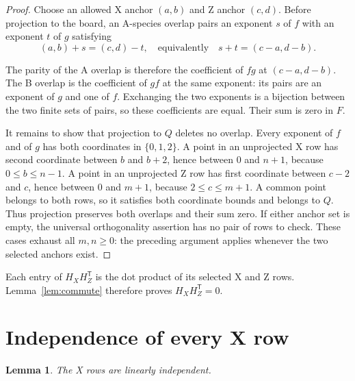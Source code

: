 \documentclass{article}
\newtheorem{lemma}{Lemma}
\begin{document}
\begin{proof}
Choose an allowed X anchor \((a,b)\) and Z anchor \((c,d)\). Before
projection to the board, an A-species overlap pairs an exponent \(s\) of \(f\) with
an exponent \(t\) of \(g\) satisfying
\begin{equation}\label{eq:overlap}
 (a,b)+s=(c,d)-t,
 \quad\text{equivalently}\quad s+t=(c-a,d-b).
\end{equation}

The parity of the A overlap is therefore the coefficient of \(fg\) at
\((c-a,d-b)\). The B overlap is the coefficient of \(gf\) at the same exponent:
its pairs are an exponent of \(g\) and one of \(f\). Exchanging the two exponents
is a bijection between the two finite sets of pairs, so these coefficients
are equal. Their sum is zero in \(F\).

It remains to show that projection to \(Q\) deletes no overlap. Every exponent of
\(f\) and of \(g\) has both coordinates in \(\{0,1,2\}\). A point in an unprojected X
row has second coordinate between \(b\) and \(b+2\), hence between \(0\) and \(n+1\),
because \(0\le b\le n-1\). A point in an unprojected Z row has first coordinate between
\(c-2\) and \(c\), hence between \(0\) and \(m+1\), because \(2\le c\le m+1\). A common
point belongs to both rows, so it satisfies both coordinate bounds and belongs to
\(Q\). Thus projection preserves both overlaps and their sum zero. If either
anchor set is empty, the universal orthogonality assertion has no pair of
rows to check. These cases exhaust all \(m,n\ge 0\): the preceding argument applies
whenever the two selected anchors exist.
\end{proof}

Each entry of \(H_XH_Z^{\mathsf T}\) is the dot product of its selected X and Z rows.
Lemma~\ref{lem:commute} therefore proves \(H_XH_Z^{\mathsf T}=0\).

\section{Independence of every X row}\label{sec:x-independence}

\begin{lemma}\label{lem:x-independent}
The X rows are linearly independent.
\end{lemma}
\end{document}
